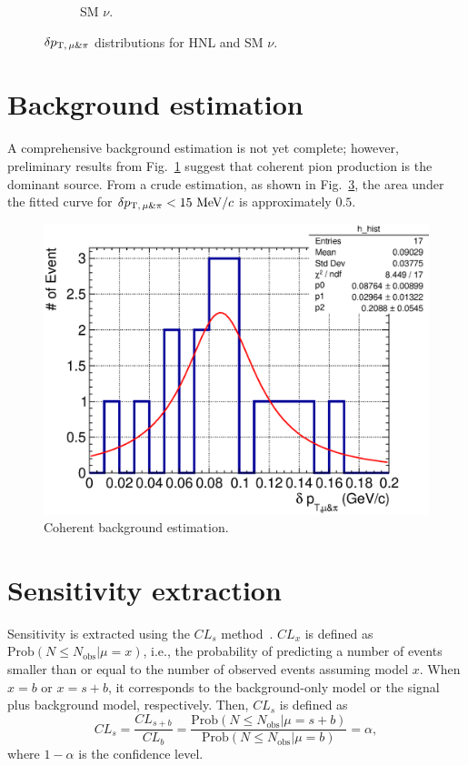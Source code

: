 \begin{figure}[!htb]
\begin{subfigure}{0.45\textwidth}
                \caption{SM $\nu$.}
                \label{fig:sm-mupidpt}
           \end{subfigure}
           \caption{$\delta p_{\textrm{T},\,\mu\&\pi}$ distributions for HNL and SM $\nu$.}
           \label{fig:mmupi-dpt}
        \end{figure}

    
    \section{Background estimation}
        A comprehensive background estimation is not yet complete; however, preliminary results from Fig.~\ref{fig:sm-mupidpt} suggest that coherent pion production is the dominant source. 
        From a crude estimation, as shown in Fig.~\ref{fig:coh-bkg}, the area under the fitted curve for $\delta p_{\textrm{T},\,\mu\&\pi}<15~\textrm{MeV}/c$ is approximately $0.5$. 
        \begin{figure}[!htb] 
            \centering
            \includegraphics[width=0.5\linewidth]{figures/hnl/hnl_sfgmu_mpdpt_hist_al-1_SM_COH_zoom_fit.eps}
            \caption{Coherent background estimation.}
            \label{fig:coh-bkg}
        \end{figure}    
    
    \section{Sensitivity extraction}
        Sensitivity is extracted using the $CL_s$ method~\cite{Read:2002hq}.
        $CL_x$ is defined as $\textrm{Prob}(N\leq N_{\textrm{obs}}| \mu = x)$, i.e., the probability of predicting a number of events smaller than or equal to the number of observed events assuming model $x$. When $x=b$ or $x=s+b$, it corresponds to the background-only model or the signal plus background model, respectively.
        Then, $CL_s$ is defined as 
        \begin{equation}
            CL_s = \frac{CL_{s+b}}{CL_{b}} = \frac{\textrm{Prob}(N\leq N_{\textrm{obs}}| \mu = s+b)}{\textrm{Prob}(N\leq N_{\textrm{obs}}| \mu = b)} = \alpha,
        \end{equation}
        where $1-\alpha$ is the confidence level.

